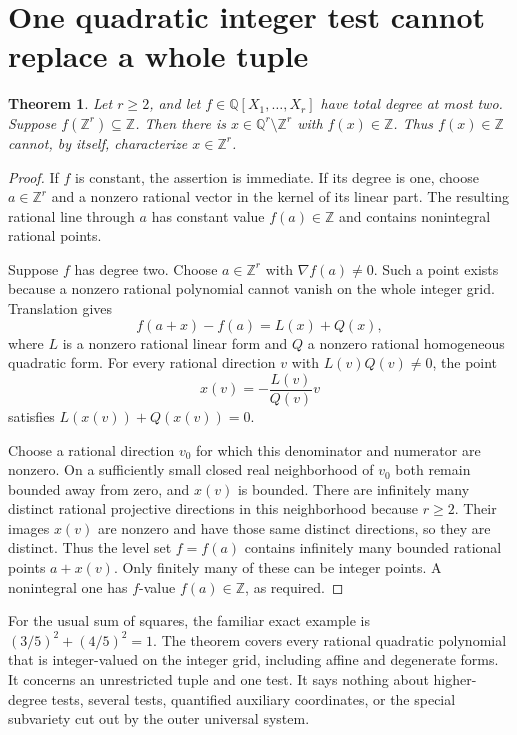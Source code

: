 \documentclass[11pt]{article}
\newtheorem{theorem}{Theorem}
\newcommand{\Q}{\mathbb Q}\newcommand{\Z}{\mathbb Z}
\begin{document}
\section{One quadratic integer test cannot replace a whole tuple}

\begin{theorem}\label{quad}
Let $r\ge2$, and let $f\in\Q[X_1,\ldots,X_r]$ have total degree
at most two. Suppose $f(\Z^r)\subseteq\Z$. Then there is
$x\in\Q^r\setminus\Z^r$ with $f(x)\in\Z$.
Thus $f(x)\in\Z$ cannot, by itself, characterize $x\in\Z^r$.
\end{theorem}
\begin{proof}
If $f$ is constant, the assertion is immediate. If its degree is one,
choose $a\in\Z^r$ and a nonzero rational vector in the kernel of its
linear part. The resulting rational line through $a$ has constant
value $f(a)\in\Z$ and contains nonintegral rational points.

Suppose $f$ has degree two. Choose $a\in\Z^r$ with
$\nabla f(a)\ne0$. Such a point exists because a nonzero rational
polynomial cannot vanish on the whole integer grid. Translation gives
\[
                   f(a+x)-f(a)=L(x)+Q(x),
\]
where $L$ is a nonzero rational linear form and $Q$ a nonzero
rational homogeneous quadratic form. For every rational direction $v$
with $L(v)Q(v)\ne0$, the point
\[
                   x(v)=-\frac{L(v)}{Q(v)}v
\]
satisfies $L(x(v))+Q(x(v))=0$.

Choose a rational direction $v_0$ for which this denominator and
numerator are nonzero. On a sufficiently small closed real neighborhood
of $v_0$ both remain bounded away from zero, and $x(v)$ is bounded.
There are infinitely many distinct rational projective directions in
this neighborhood because $r\ge2$. Their images $x(v)$ are nonzero
and have those same distinct directions, so they are distinct.
Thus the level set $f=f(a)$ contains infinitely many bounded rational
points $a+x(v)$. Only finitely many of these can be integer points.
A nonintegral one has $f$-value $f(a)\in\Z$, as required.
\end{proof}

For the usual sum of squares, the familiar exact example is
$(3/5)^2+(4/5)^2=1$. The theorem covers every rational quadratic
polynomial that is integer-valued on the integer grid, including affine
and degenerate forms. It concerns an unrestricted tuple and one test.
It says nothing about higher-degree tests, several tests, quantified
auxiliary coordinates, or the special subvariety cut out by the outer
universal system.
\end{document}
